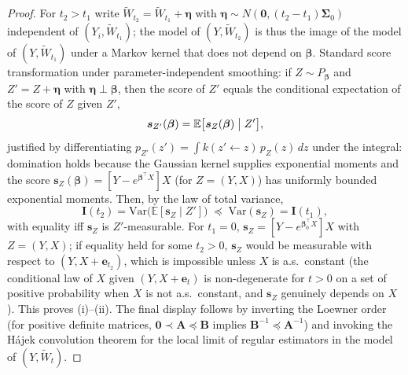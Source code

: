 \documentclass[11pt]{article}
\theoremstyle{plain}
\theoremstyle{definition}
\newcommand{\E}{\mathbb{E}}
\newcommand{\Var}{\mathrm{Var}}
\newcommand{\bet}{\bm{\beta}}
\newcommand{\bSig}{\bm{\Sigma}}
\begin{document}
\begin{proof}
For $t_2>t_1$ write $\widetilde W_{t_2}
=\widetilde W_{t_1}+\bm\eta$ with
$\bm\eta\sim N(\bm 0,(t_2-t_1)\bSig_0)$ independent of
$(Y_i,\widetilde W_{t_1})$; the model of $(Y,\widetilde W_{t_2})$ is
thus the image of the model of $(Y,\widetilde W_{t_1})$ under a
Markov kernel that does not depend on $\bet$. Standard score
transformation under parameter-independent smoothing: if $Z\sim P_{\bet}$
and $Z'=Z+\bm\eta$ with $\bm\eta\perp\bet$, then the score of $Z'$
equals the conditional expectation of the score of $Z$ given $Z'$,
\[
  \bm s_{Z'}(\bet)=\E\bigl[\bm s_Z(\bet)\bigm|Z'\bigr],
\]
justified by differentiating
$p_{Z'}(z')=\int k(z'\leftarrow z)\,p_Z(z)\,dz$ under the integral:
domination holds because the Gaussian kernel supplies exponential
moments and the score
$\bm s_Z(\bet)=[Y-e^{\bet^\top X}]X$ (for $Z=(Y,X)$) has uniformly
bounded exponential moments. Then, by the law of total variance,
\[
  \bm I(t_2)=\Var\bigl(\E[\bm s_Z\mid Z']\bigr)
  \;\preceq\;\Var(\bm s_Z)=\bm I(t_1),
\]
with equality iff $\bm s_Z$ is $Z'$-measurable. For $t_1=0$,
$\bm s_Z=[Y-e^{\bet_0^\top X}]X$ with $Z=(Y,X)$; if equality held for
some $t_2>0$, $\bm s_Z$ would be measurable with respect to
$(Y,X+\bm e_{t_2})$, which is impossible unless $X$ is a.s.\ constant
(the conditional law of $X$ given $(Y,X+\bm e_t)$ is non-degenerate for
$t>0$ on a set of positive probability when $X$ is not a.s.\ constant,
and $\bm s_Z$ genuinely depends on $X$). This proves (i)--(ii). The
final display follows by inverting the Loewner order (for positive
definite matrices, $\bm 0\prec\bm A\preceq\bm B$ implies
$\bm B^{-1}\preceq\bm A^{-1}$) and invoking the H\'ajek convolution
theorem for the local limit of regular estimators in the model of
$(Y,\widetilde W_t)$.
\end{proof}
\end{document}
